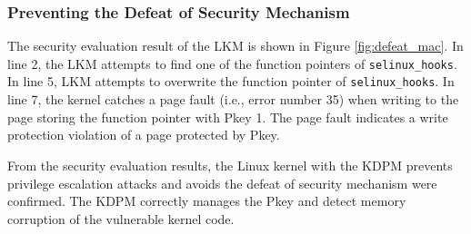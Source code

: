 \subsubsection{Preventing the Defeat of Security Mechanism}
The security evaluation result of the LKM is shown in Figure
\ref{fig:defeat_mac}.
In line 2, the LKM attempts to find one of the function pointers of
\verb|selinux_hooks|. In line 5, LKM attempts to overwrite the function pointer of
\verb|selinux_hooks|.
In line 7, the kernel catches a page fault (i.e., error number 35) when writing
to the page storing the function pointer with Pkey 1. The page fault
indicates a write protection violation of a page protected by Pkey.

%

From the security evaluation results, the Linux kernel with the KDPM prevents
privilege escalation attacks and avoids the defeat of security mechanism were
confirmed. The KDPM correctly manages the Pkey and detect memory corruption of
the vulnerable kernel code.


